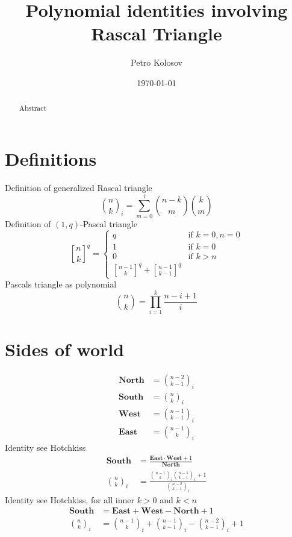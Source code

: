 \documentclass[12pt,letterpaper,oneside,reqno]{amsart}
\title[Polynomial identities involving Rascal Triangle]
{Polynomial identities involving Rascal Triangle}
\author[Petro Kolosov]{Petro Kolosov}
\date{\today}
\newcommand \rascalNumber [3] {\binom{#1}{#2}_{#3}}
\newcommand \north[0] {\mathbf{North}}
\newcommand \south[0] {\mathbf{South}}
\newcommand \west[0] {\mathbf{West}}
\newcommand \east[0] {\mathbf{East}}
\newcommand{\genstirlingI}[3]{%
    \genfrac{[}{]}{0pt}{#1}{#2}{#3}%
}
\newcommand{\oneQBinomial}[3]{\genstirlingI{}{#1}{#2}^{#3}}
\numberwithin{equation}{section}
\begin{document}
\begin{abstract}
    Abstract
\end{abstract}

\maketitle


\section{Definitions}
Definition of generalized Rascal triangle
\begin{equation}
    \rascalNumber{n}{k}{i} = \sum_{m=0}^{i} \binom{n-k}{m} \binom{k}{m}
\end{equation}
Definition of $(1, q)$-Pascal triangle
\begin{equation*}
    \oneQBinomial{n}{k}{q} =
    \begin{cases}
        q & \text{if } k=0, n=0 \\
        1 & \text{if } k=0 \\
        0 & \text{if } k > n \\
        \oneQBinomial{n-1}{k}{q} + \oneQBinomial{n-1}{k-1}{q}
    \end{cases}
\end{equation*}
Pascals triangle as polynomial
\begin{equation}
    \binom{n}{k} = \prod_{i=1}^{k} \frac{n-i+1}{i}
\end{equation}


\section{Sides of world}
\begin{align*}
    \north &= \rascalNumber{n-2}{k-1}{i} \\
    \south &= \rascalNumber{n}{k}{i} \\
    \west  &= \rascalNumber{n-1}{k-1}{i} \\
    \east  &= \rascalNumber{n-1}{k}{i}
\end{align*}
Identity see Hotchkiss
\begin{align}
    \south                  &= \frac{\east \cdot \west + 1}{\north} \\
    \rascalNumber{n}{k}{i}  &= \frac{\rascalNumber{n-1}{k}{i} \rascalNumber{n-1}{k-1}{i} +1}{\rascalNumber{n-2}{k-1}{i}}
\end{align}
Identity see Hotchkiss, for all inner $k > 0$ and $k < n$
\begin{align}
    \south                 &= \east + \west - \north  + 1 \\
    \rascalNumber{n}{k}{i} &= \rascalNumber{n-1}{k}{i} + \rascalNumber{n-1}{k-1}{i} - \rascalNumber{n-2}{k-1}{i} + 1
\end{align}
\end{document}

